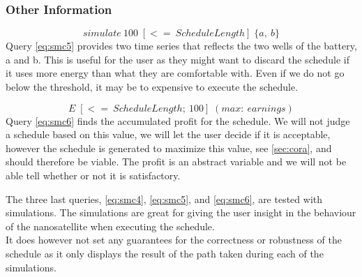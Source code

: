 \subsubsection*{Other Information}
\begin{equation} \label{eq:smc5}
	simulate\ 100 \; [<=\ ScheduleLength]\; \{ a,\ b\}
\end{equation}
Query \ref{eq:smc5} provides two time series that reflects the two wells of the battery, a and b. This is useful for the user as they might want to discard the schedule if it uses more energy than what they are comfortable with. Even if we do not go below the threshold, it may be to expensive to execute the schedule. 

\begin{equation} \label{eq:smc6}
	E \; [<=\ ScheduleLength;\ 100]\; ( max:\ earnings)
\end{equation}
Query \ref{eq:smc6} finds the accumulated profit for the schedule. We will not judge a schedule based on this value, we will let the user decide if it is acceptable, however the schedule is generated to maximize this value, see \cref{sec:cora}, and should therefore be viable. The profit is an abstract variable and we will not be able tell whether or not it is satisfactory.

The three last queries, \ref{eq:smc4}, \ref{eq:smc5}, and \ref{eq:smc6}, are tested with simulations. The simulations are great for giving the user insight in the behaviour of the nanosatellite when executing the schedule. \\
It does however not set any guarantees for the correctness or robustness of the schedule as it only displays the result of the path taken during each of the simulations.

